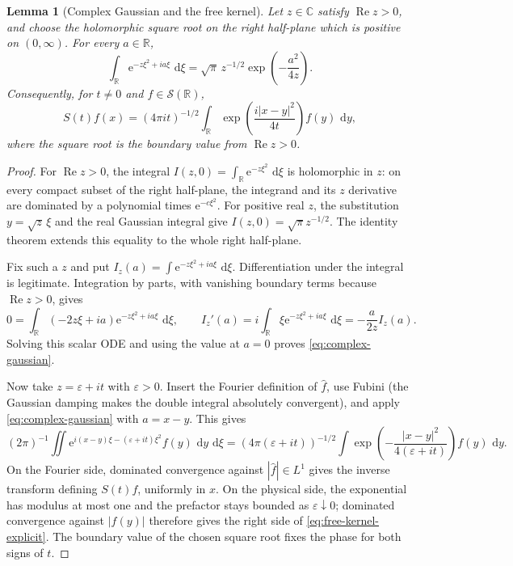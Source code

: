 \documentclass[11pt,oneside]{book}
\newtheorem{lemma}[theorem]{Lemma}
\theoremstyle{definition}
\theoremstyle{remark}
\newcommand{\R}{\mathbb R}
\newcommand{\C}{\mathbb C}
\newcommand{\1}{\mathbf 1}
\newcommand{\Rea}{\operatorname{Re}}
\newcommand{\dd}{\,\mathrm d}
\newcommand{\e}{\mathrm e}
\newcommand{\eps}{\varepsilon}
\begin{document}
\begin{lemma}[Complex Gaussian and the free kernel]
\label{lem:complex-gaussian-kernel}
Let $z\in\C$ satisfy $\Rea z>0$, and choose the holomorphic square root on
the right half-plane which is positive on $(0,\infty)$.  For every
$a\in\R$,
\begin{equation}
 \int_\R \e^{-z\xi^2+ia\xi}\,\dd\xi
 =\sqrt\pi\,z^{-1/2}\exp\!\left(-\frac{a^2}{4z}\right).
 \label{eq:complex-gaussian}
\end{equation}
Consequently, for $t\ne0$ and $f\in\mathcal S(\R)$,
\begin{equation}
 S(t)f(x)=(4\pi it)^{-1/2}\int_\R
 \exp\!\left(\frac{i|x-y|^2}{4t}\right)f(y)\,\dd y,
 \label{eq:free-kernel-explicit}
\end{equation}
where the square root is the boundary value from $\Rea z>0$.
\end{lemma}

\begin{proof}
For $\Rea z>0$, the integral
$I(z,0)=\int_\R\e^{-z\xi^2}\,\dd\xi$ is holomorphic in $z$: on every
compact subset of the right half-plane, the integrand and its $z$ derivative
are dominated by a polynomial times $\e^{-c\xi^2}$.  For positive real $z$,
the substitution $y=\sqrt z\,\xi$ and the real Gaussian integral give
$I(z,0)=\sqrt\pi z^{-1/2}$.  The identity theorem extends this equality to
the whole right half-plane.

Fix such a $z$ and put
$I_z(a)=\int\e^{-z\xi^2+ia\xi}\,\dd\xi$.  Differentiation under the integral
is legitimate.  Integration by parts, with vanishing boundary terms because
$\Rea z>0$, gives
\[
 0=\int_\R(-2z\xi+ia)\e^{-z\xi^2+ia\xi}\,\dd\xi,
 \qquad
 I_z'(a)=i\int_\R\xi\e^{-z\xi^2+ia\xi}\,\dd\xi
        =-\frac a{2z}I_z(a).
\]
Solving this scalar ODE and using the value at $a=0$ proves
\eqref{eq:complex-gaussian}.

Now take $z=\eps+it$ with $\eps>0$.  Insert the Fourier definition of
$\widehat f$, use Fubini (the Gaussian damping makes the double integral
absolutely convergent), and apply \eqref{eq:complex-gaussian} with
$a=x-y$.  This gives
\[
 (2\pi)^{-1}\iint
  \e^{i(x-y)\xi-(\eps+it)\xi^2}f(y)\,\dd y\,\dd\xi
 =(4\pi(\eps+it))^{-1/2}\int
  \exp\!\left(-\frac{|x-y|^2}{4(\eps+it)}\right)f(y)\,\dd y.
\]
On the Fourier side, dominated convergence against
$|\widehat f|\in L^1$ gives the inverse transform defining $S(t)f$, uniformly
in $x$.  On the physical side, the exponential has modulus at most one and
the prefactor stays bounded as $\eps\downarrow0$; dominated convergence
against $|f(y)|$ therefore gives the right side of
\eqref{eq:free-kernel-explicit}.  The boundary value of the chosen square
root fixes the phase for both signs of $t$.
\end{proof}
\end{document}
